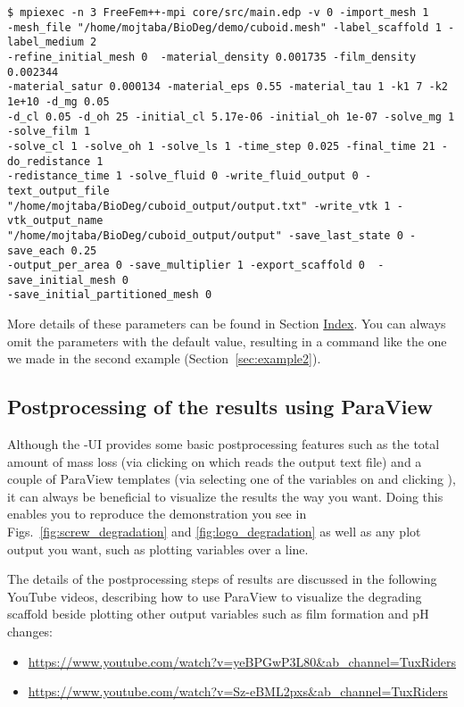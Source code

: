 \begin{verbatim}
$ mpiexec -n 3 FreeFem++-mpi core/src/main.edp -v 0 -import_mesh 1 
-mesh_file "/home/mojtaba/BioDeg/demo/cuboid.mesh" -label_scaffold 1 -label_medium 2 
-refine_initial_mesh 0  -material_density 0.001735 -film_density 0.002344 
-material_satur 0.000134 -material_eps 0.55 -material_tau 1 -k1 7 -k2 1e+10 -d_mg 0.05 
-d_cl 0.05 -d_oh 25 -initial_cl 5.17e-06 -initial_oh 1e-07 -solve_mg 1 -solve_film 1 
-solve_cl 1 -solve_oh 1 -solve_ls 1 -time_step 0.025 -final_time 21 -do_redistance 1  
-redistance_time 1 -solve_fluid 0 -write_fluid_output 0 -text_output_file 
"/home/mojtaba/BioDeg/cuboid_output/output.txt" -write_vtk 1 -vtk_output_name 
"/home/mojtaba/BioDeg/cuboid_output/output" -save_last_state 0 -save_each 0.25 
-output_per_area 0 -save_multiplier 1 -export_scaffold 0  -save_initial_mesh 0 
-save_initial_partitioned_mesh 0
\end{verbatim}

More details of these parameters can be found in Section \hyperref[sec:index]{Index}. You can always omit the parameters with the default value, resulting in a command like the one we made in the second example (Section~\ref{sec:example2}).

\subsection{Postprocessing of the results using ParaView} \label{sec:postprocess}

Although the \biodeg{}-UI provides some basic postprocessing features such as the total amount of mass loss (via clicking on  which reads the output text file) and a couple of ParaView templates (via selecting one of the variables on  and clicking ), it can always  be beneficial to visualize the results the way you want. Doing this enables you to reproduce the demonstration you see in Figs.~\ref{fig:screw_degradation} and \ref{fig:logo_degradation} as well as any plot output you want, such as plotting variables over a line.

The details of the postprocessing steps of \biodeg{} results are discussed in the following YouTube videos, describing how to use ParaView to visualize the degrading scaffold beside plotting other output variables such as film formation and pH changes:

\begin{itemize}
\item 
\url{https://www.youtube.com/watch?v=yeBPGwP3L80&ab_channel=TuxRiders}
\item
\url{https://www.youtube.com/watch?v=Sz-eBML2pxs&ab_channel=TuxRiders}
\end{itemize}

